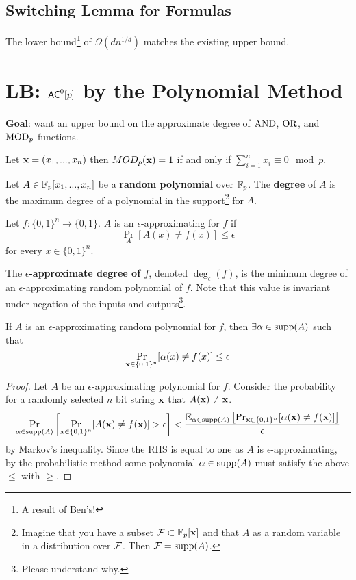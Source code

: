 \documentclass[11pt]{article}
\begin{document}
	\subsection{Switching Lemma for Formulas}
	The lower bound\footnote{A result of Ben's!} of $\Omega(dn^{1/d})$ matches the existing upper bound. 
	
\section{LB: \texorpdfstring{$\mathsf{AC}^0[p]$}{AC0[p]} by the Polynomial Method}
	\textbf{Goal}: want an upper bound on the approximate degree of $\mathrm{AND}$, $\mathrm{OR}$, and $\mathrm{MOD}_p$ functions.
	\begin{definition}
		\label{def:EpsApprox}
		Let $\mathbf{x} = (x_1,..., x_n)$ then $MOD_p(\mathbf{x}) = 1$ if and only if $\sum_{i = 1}^{n} x_i \equiv 0 \mod p$. 
	
		Let $A \in \mathbb{F}_p[x_1, ..., x_n]$ be a \textbf{random polynomial} over $\mathbb{F}_p$. The \textbf{degree} of $A$ is the maximum degree of a polynomial in the support\footnote{Imagine that you have a subset $\mathcal{F} \subset \mathbb{F}_p[\mathbf{x}]$ and that $A$ as a random variable in a distribution over $\mathcal{F}$. Then $\mathcal{F} = \operatorname*{supp}(A)$.} for $A$. 
		
		Let $f: \{0,1\}^n \rightarrow \{0,1\}$. $A$ is an $\epsilon$-approximating for $f$ if
		\[\Pr_A[A(x) \neq f(x)] \leq \epsilon \]
		for every $x \in \{0,1\}^n$. 
		
		The \textbf{$\epsilon$-approximate degree of $f$}, denoted $\deg_{\epsilon}(f)$, is the minimum degree of an $\epsilon$-approximating random polynomial of $f$. Note that this value is invariant under negation of the inputs and outputs\footnote{Please understand why.}.
	\end{definition}
	
	\begin{lemma}
		\label{lem:EpsApprox-ExistWellApproxSupport}
		If $A$ is an $\epsilon$-approximating random polynomial for $f$, then $\exists \alpha \in \operatorname*{supp}(A)$ such that
		\[\Pr_{\mathbf{x} \in \{0,1\}^{n}}[\alpha(x) \neq f(x)] \leq \epsilon\]
	\end{lemma}
	\begin{proof}
		Let $A$ be an $\epsilon$-approximating polynomial for $f$. Consider the probability for a randomly selected $n$ bit string $\mathbf{x}$ that $A(\mathbf{x}) \neq \mathbf{x}$.
		\[\Pr_{\alpha \in \operatorname*{supp}(A)}\left[\Pr_{\mathbf{x} \in \{0,1\}^n}[A(\mathbf{x}) \neq f(\mathbf{x})] > \epsilon\right] < \frac{\operatorname{\mathbb{E}}_{\alpha \in \operatorname*{supp}(A)}\left[\Pr_{\mathbf{x} \in \{0,1\}^n}[\alpha(\mathbf{x}) \neq f(\mathbf{x})]\right]}{\epsilon}\]
		by Markov's inequality. Since the RHS is equal to one as $A$ is $\epsilon$-approximating, by the probabilistic method some polynomial $\alpha \in \operatorname*{supp}(A)$ must satisfy the above $\leq$ with $\geq$. 
	\end{proof}
		
\end{document}
